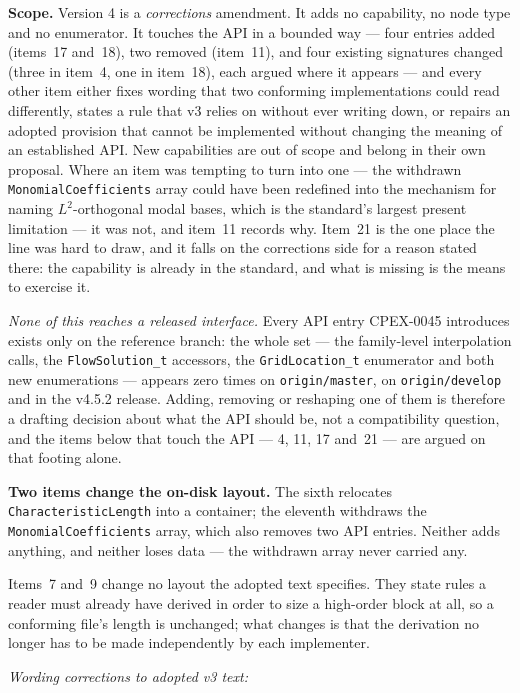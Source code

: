 \documentclass[11pt,letterpaper]{article}
\newif\ifvfourdraft
\newenvironment{v4block}{\ifvfourdraft\color{v4violet}\fi\ignorespaces}{\par}
\begin{document}
{\begin{v4block}
\medskip
\noindent\textbf{Scope.}  Version 4 is a \emph{corrections} amendment.  It adds
no capability, no node type and no enumerator.  It touches the API in a bounded
way --- four entries added (items~17 and~18), two removed (item~11), and four
existing signatures changed (three in item~4, one in item~18), each argued where
it appears --- and every other item either fixes
wording that two conforming implementations could read differently, states a rule
that v3 relies on without ever writing down, or repairs an adopted provision that
cannot be implemented without changing the meaning of an established API.  New
capabilities are out of scope and belong in their own proposal.  Where an item was
tempting to turn into one --- the withdrawn \texttt{MonomialCoefficients} array
could have been redefined into the mechanism for naming $L^2$-orthogonal modal
bases, which is the standard's largest present limitation --- it was not, and
item~11 records why.  Item~21 is the one place the line was hard to draw, and it
falls on the corrections side for a reason stated there: the capability is
already in the standard, and what is missing is the means to exercise it.

\noindent \emph{None of this reaches a released interface.}  Every API entry
CPEX-0045 introduces exists only on the reference branch: the whole set ---
the family-level interpolation calls, the \texttt{FlowSolution\_t} accessors, the
\texttt{GridLocation\_t} enumerator and both new enumerations --- appears zero
times on \texttt{origin/master}, on \texttt{origin/develop} and in the v4.5.2
release.  Adding, removing or reshaping one of them is therefore a drafting
decision about what the API should be, not a compatibility question, and the
items below that touch the API --- 4, 11, 17 and~21 --- are argued on that
footing alone.

\noindent \textbf{Two items change the on-disk layout.}  The sixth relocates
\texttt{CharacteristicLength} into a container; the eleventh withdraws the
\texttt{MonomialCoefficients} array, which also removes two API entries.  Neither
adds anything, and neither loses data --- the withdrawn array never carried any.

\noindent Items~7 and~9 change no layout the adopted text specifies.  They state
rules a reader must already have derived in order to size a high-order block at
all, so a conforming file's length is unchanged; what changes is that the
derivation no longer has to be made independently by each implementer.

\medskip
\noindent\textit{Wording corrections to adopted v3 text:}


\end{v4block}}
\end{document}
